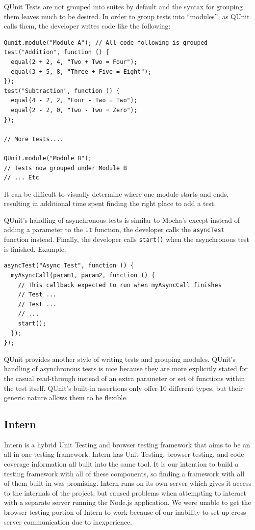 \documentclass[12pt]{ucthesis}
\begin{document}
QUnit Tests are not grouped into suites by default and the syntax for grouping them leaves much to be desired. In order to group tests into ``modules'', as QUnit calls them, the developer writes code like the following:
\begin{lstlisting}
Qunit.module("Module A"); // All code following is grouped
test("Addition", function () {
  equal(2 + 2, 4, "Two + Two = Four");
  equal(3 + 5, 8, "Three + Five = Eight");
});
test("Subtraction", function () {
  equal(4 - 2, 2, "Four - Two = Two");
  equal(2 - 2, 0, "Two - Two = Zero");
});

// More tests....

QUnit.module("Module B");
// Tests now grouped under Module B
// ... Etc
\end{lstlisting}
It can be difficult to visually determine where one module starts and ends, resulting in additional time spent finding the right place to add a test.

QUnit's handling of asynchronous tests is similar to Mocha's except instead of adding a parameter to the \lstinline{it} function, the developer calls the \lstinline{asyncTest} function instead. Finally, the developer calls \lstinline{start()} when the asynchronous test is finished. Example:
\begin{lstlisting}
asyncTest("Async Test", function () {
  myAsyncCall(param1, param2, function () {
    // This callback expected to run when myAsyncCall finishes
    // Test ...
    // Test ...
    // ...
    start();
  });
});
\end{lstlisting}

QUnit provides another style of writing tests and grouping modules. QUnit's handling of asynchronous tests is nice because they are more explicitly stated for the casual read-through instead of an extra parameter or set of functions within the test itself. QUnit's built-in assertions only offer 10 different types, but their generic nature allows them to be flexible.

\subsection{Intern}
Intern \cite{InternIO} is a hybrid Unit Testing and browser testing framework that aims to be an all-in-one testing framework. Intern has Unit Testing, browser testing, and code coverage information all built into the same tool. It is our intention to build a testing framework with all of these components, so finding a framework with all of them built-in was promising. Intern runs on its own server which gives it access to the internals of the project, but caused problems when attempting to interact with a separate server running the Node.js application. We were unable to get the browser testing portion of Intern to work because of our inability to set up cross-server communication due to inexperience.
\end{document}
